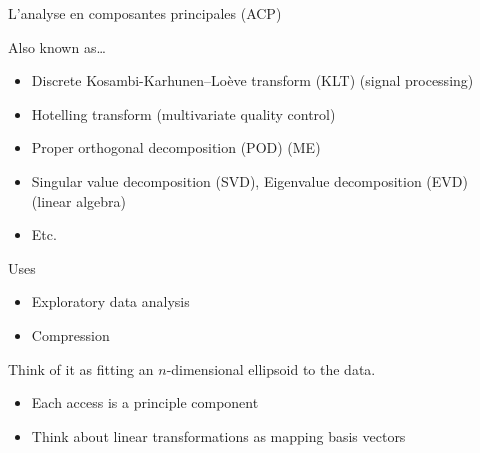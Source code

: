 




L'analyse en composantes principales (ACP)

Also known as\dots
\begin{itemize}
\item Discrete Kosambi-Karhunen–Loève transform (KLT) (signal processing)
\item Hotelling transform (multivariate quality control)
\item Proper orthogonal decomposition (POD) (ME)
\item Singular value decomposition (SVD), Eigenvalue decomposition (EVD) (linear algebra)
\item Etc.
\end{itemize}

Uses
\begin{itemize}
\item Exploratory data analysis
\item Compression
\end{itemize}

Think of it as fitting an $n$-dimensional ellipsoid to the data.
\begin{itemize}
\item Each access is a principle component
\item Think about linear transformations as mapping basis vectors
\end{itemize}

